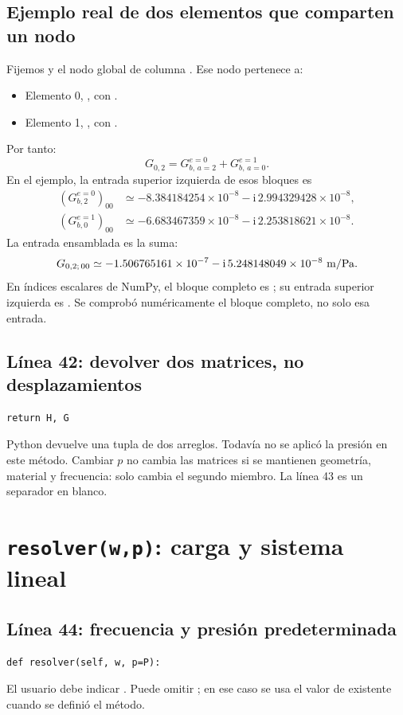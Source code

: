 \documentclass[11pt,a4paper]{article}
\numberwithin{equation}{section}
\newcommand{\ii}{\mathrm{i}}
\DeclareRobustCommand{\code}[1]{\texttt{\detokenize{#1}}}
\begin{document}
\subsection{Ejemplo real de dos elementos que comparten un nodo}
Fijemos \code{ic=0} y el nodo global de columna \code{g=2}.
Ese nodo pertenece a:
\begin{itemize}
 \item Elemento 0, \code{cn=[0,1,2]}, con \code{a=2}.
 \item Elemento 1, \code{cn=[2,3,4]}, con \code{a=0}.
\end{itemize}
Por tanto:
\begin{equation}
 G_{0,2}=G^{e=0}_{b,\,a=2}+G^{e=1}_{b,\,a=0}.
\end{equation}
En el ejemplo, la entrada superior izquierda de esos bloques es
\begin{align}
 (G^{e=0}_{b,2})_{00}
 &\simeq-8.384184254\times10^{-8}
         -\ii\,2.994329428\times10^{-8},\\
 (G^{e=1}_{b,0})_{00}
 &\simeq-6.683467359\times10^{-8}
         -\ii\,2.253818621\times10^{-8}.
\end{align}
La entrada ensamblada es la suma:
\begin{equation}
 G_{0,2;\,00}\simeq
 -1.506765161\times10^{-7}
 -\ii\,5.248148049\times10^{-8}\ {\rm m/Pa}.
\end{equation}
En \'indices escalares de NumPy, el bloque completo es
\code{G[0:2,4:6]}; su entrada superior izquierda es \code{G[0,4]}.
Se comprob\'o num\'ericamente el bloque completo, no solo esa entrada.

\subsection{L\'inea 42: devolver dos matrices, no desplazamientos}
\begin{lstlisting}
return H, G
\end{lstlisting}
Python devuelve una tupla de dos arreglos.
Todav\'ia no se aplic\'o la presi\'on en este m\'etodo.
Cambiar $p$ no cambia las matrices si se mantienen geometr\'ia,
material y frecuencia: solo cambia el segundo miembro.
La l\'inea 43 es un separador en blanco.

\section{\texttt{resolver(w,p)}: carga y sistema lineal}
\label{sec:resolver}
\subsection{L\'inea 44: frecuencia y presi\'on predeterminada}
\begin{lstlisting}
def resolver(self, w, p=P):
\end{lstlisting}
El usuario debe indicar \code{w}. Puede omitir \code{p};
en ese caso se usa el valor de \code{P} existente cuando se defini\'o
el m\'etodo.
\end{document}

